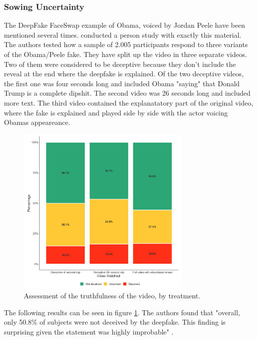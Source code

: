 \documentclass[
  a4paper,  %
  twoside,  %
  bibliography=totoc,
  headsepline,
  cleardoublepage=empty,
  parskip=half,
  draft=false
]{scrbook}
\begin{document}
\subsubsection*{Sowing Uncertainty}
The DeepFake FaceSwap example of Obama, voiced by Jordan Peele have been mentioned several times. \citeauthor{vaccariDeepfakesDisinformationExploring2020} conducted a person study with exactly this material. The authors tested how a sample of 2.005 participants respond to three variants of the Obama/Peele fake. They have split up the video in three separate videos. Two of them were considered to be deceptive because they don't include the reveal at the end where the deepfake is explained. Of the two deceptive videos, the first one was four seconds long and included Obama "saying" that Donald Trump is a complete dipshit. The second video was 26 seconds long and included more text. The third video contained the explanatatory part of the original video, where the fake is explained and played side by side with the actor voicing Obamas appeareance.
\begin{figure}[h]
  \centering
  \includegraphics[width=0.75\textwidth]{./graphics/images/obamafake.png}
  \caption{Assessment of the truthfulness of the video, by treatment. \cite{vaccariDeepfakesDisinformationExploring2020}}
  \label{fig:obamafake-eval}
\end{figure}
The following results can be seen in figure \ref{fig:obamafake-eval}. The authors found that "overall, only 50.8\% of subjects were not deceived by the deepfake. This finding is surprising given the statement was highly improbable" \cite{vaccariDeepfakesDisinformationExploring2020}. 
\end{document}
